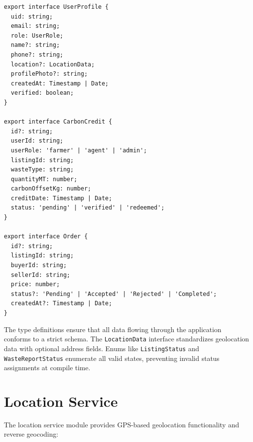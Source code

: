 \documentclass[a4paper,12pt,oneside]{report}
\begin{document}
\begin{lstlisting}[caption={Type Definitions (types.ts)}, label={lst:types}]
export interface UserProfile {
  uid: string;
  email: string;
  role: UserRole;
  name?: string;
  phone?: string;
  location?: LocationData;
  profilePhoto?: string;
  createdAt: Timestamp | Date;
  verified: boolean;
}

export interface CarbonCredit {
  id?: string;
  userId: string;
  userRole: 'farmer' | 'agent' | 'admin';
  listingId: string;
  wasteType: string;
  quantityMT: number;
  carbonOffsetKg: number;
  creditDate: Timestamp | Date;
  status: 'pending' | 'verified' | 'redeemed';
}

export interface Order {
  id?: string;
  listingId: string;
  buyerId: string;
  sellerId: string;
  price: number;
  status?: 'Pending' | 'Accepted' | 'Rejected' | 'Completed';
  createdAt?: Timestamp | Date;
}
\end{lstlisting}

\noindent The type definitions ensure that all data flowing through the application conforms to a strict schema. The \texttt{LocationData} interface standardizes geolocation data with optional address fields. Enums like \texttt{ListingStatus} and \texttt{WasteReportStatus} enumerate all valid states, preventing invalid status assignments at compile time.

\section{Location Service}

\noindent The location service module provides GPS-based geolocation functionality and reverse geocoding:
\end{document}
